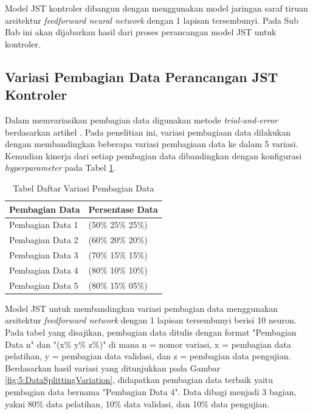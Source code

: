 Model JST kontroler dibangun dengan menggunakan model jaringan saraf tiruan arsitektur \textit{feedforward neural network} dengan 1 lapisan tersembunyi. Pada Sub Bab ini akan dijabarkan hasil dari proses perancangan model JST untuk kontroler.

\subsection{Variasi Pembagian Data Perancangan JST Kontroler}

Dalam memvariasikan pembagian data digunakan metode \textit{trial-and-error} berdasarkan artikel \cite{DataSplitting}. Pada penelitian ini, variasi pembagiaan data dilakukan dengan membandingkan beberapa variasi pembagiaan data ke dalam 5 variasi. Kemudian kinerja dari setiap pembagian data dibandingkan dengan konfigurasi \textit{hyperparameter} pada Tabel \ref{tbl:5:NeuronVariation}.

\begin{table}[!h]
	\caption{Tabel Daftar Variasi Pembagian Data}
	\label{tbl:5:NeuronVariation}
	\centering
	\begin{tabular}{|p{3.2cm}|p{3cm}|}
		\hline
		\textbf{Pembagian Data} & \textbf{Persentase Data} \\ \hline
		Pembagian Data 1 & (50\% 25\% 25\%) \\ \hline
		Pembagian Data 2 & (60\% 20\% 20\%) \\ \hline
		Pembagian Data 3 & (70\% 15\% 15\%) \\ \hline
		Pembagian Data 4 & (80\% 10\% 10\%) \\ \hline
		Pembagian Data 5 & (80\% 15\% 05\%) \\ \hline
	\end{tabular}
\end{table}

Model JST untuk membandingkan variasi pembagian data menggunakan arsitektur \textit{feedforward network} dengan 1 lapisan tersembunyi berisi 10 neuron. Pada tabel yang disajikan, pembagian data ditulis dengan format "Pembagian Data n" dan "(x\% y\% z\%)" di mana n = nomor variasi, x = pembagian data pelatihan, y = pembagian data validasi, dan z = pembagian data pengujian. Berdasarkan hasil variasi yang ditunjukkan pada Gambar \ref{fig:5:DataSplittingVariation}, didapatkan pembagian data terbaik yaitu pembagian data bernama "Pembagian Data 4". Data dibagi menjadi 3 bagian, yakni 80\% data pelatihan, 10\% data validasi, dan 10\% data pengujian.

